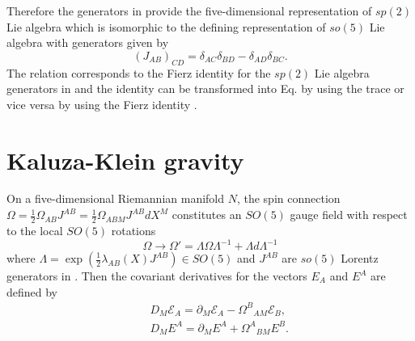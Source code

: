 \documentclass[12pt,epsf]{article}
\begin{document}
Therefore the generators in  provide the five-dimensional representation of $sp(2)$ Lie algebra
which is isomorphic to the defining representation of $so(5)$ Lie algebra with generators given by
\begin{equation}\label{so5-defrep}
  (J_{AB})_{CD} = \delta_{AC} \delta_{BD} - \delta_{AD} \delta_{BC}.
\end{equation}
The relation  corresponds to the Fierz identity for the $sp(2)$ Lie algebra generators in 
and the identity  can be transformed into Eq.  by using the trace 
or vice versa by using the Fierz identity .






\section{Kaluza-Klein gravity}




On a five-dimensional Riemannian manifold $N$, the spin connection $\Omega = \frac{1}{2} \Omega_{AB} J^{AB}
= \frac{1}{2} \Omega_{AB M} J^{AB} dX^M$ constitutes an $SO(5)$ gauge field with respect to the local
$SO(5)$ rotations
$$ \Omega \to \Omega'= \Lambda \Omega \Lambda^{-1} + \Lambda d \Lambda^{-1} $$
where $\Lambda = \exp (\frac{1}{2} \lambda_{AB}(X) J^{AB} ) \in SO(5)$ and $J^{AB}$ are $so(5)$ Lorentz generators
in .
Then the covariant derivatives for the vectors $E_A$ and $E^A$ are defined by
\begin{eqnarray*}
  && D_M \mathcal{E}_A = \partial_M \mathcal{E}_A - {\Omega^B}_{A M} \mathcal{E}_B,   \\
  && D_M E^A = \partial_M E^A + {\Omega^A}_{B M} E^B.
\end{eqnarray*}
\end{document}
